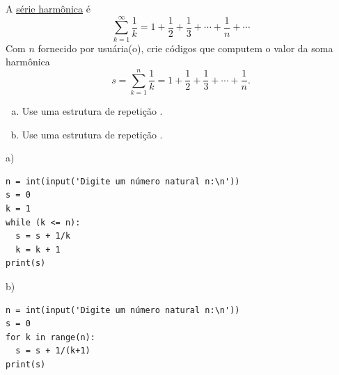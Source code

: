 \begin{exer}
  A \href{https://pt.wikipedia.org/wiki/S\%C3\%A9rie_harm\%C3\%B3nica_(matem\%C3\%A1tica)}{série harmônica} é
  \begin{equation}
    \sum_{k=1}^\infty \frac{1}{k} = 1 + \frac{1}{2} + \frac{1}{3} + \cdots + \frac{1}{n} + \cdots
  \end{equation}
  Com $n$ fornecido por usuária(o), crie códigos que computem o valor da soma harmônica
  \begin{equation}
    s = \sum_{k=1}^n \frac{1}{k} = 1 + \frac{1}{2} + \frac{1}{3} + \cdots + \frac{1}{n}.
  \end{equation}
  \begin{enumerate}[a)]
  \item Use uma estrutura de repetição {\PYTHONwhile}.
  \item Use uma estrutura de repetição {\PYTHONfor}.
  \end{enumerate}
\end{exer}
\begin{resp}
a)

\begin{lstlisting}
n = int(input('Digite um número natural n:\n'))
s = 0
k = 1
while (k <= n):
  s = s + 1/k
  k = k + 1
print(s)
\end{lstlisting}

b)

\begin{lstlisting}
n = int(input('Digite um número natural n:\n'))
s = 0
for k in range(n):
  s = s + 1/(k+1)
print(s)
\end{lstlisting}

\end{resp}

